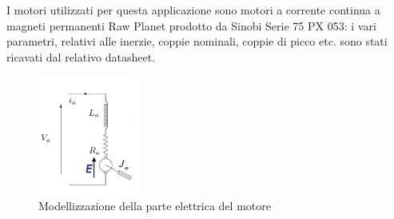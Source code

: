 I motori utilizzati per questa applicazione sono motori a corrente
continua a magneti permanenti Raw Planet prodotto da Sinobi Serie 75 PX 053: i vari parametri, relativi alle inerzie, coppie nominali, coppie di picco etc. sono stati ricavati dal relativo datasheet.

\begin{figure}[H]
	\centering   	
	\includegraphics[width=0.3\textwidth]{Immagini/motor_electric_model.png}
	\caption{Modellizzazione della parte elettrica del motore}
	\label{fig:electric_motor_model}
\end{figure}


